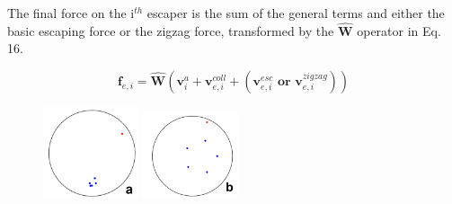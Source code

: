 \documentclass[%
11pt,
amsmath, amssymb,
aps,
pra
]{revtex4-2}
\newcommand{\threeImageSpacing}{0.25\textwidth}
\begin{document}
The final force on the i\(^{th}\) escaper is the sum of the general terms and either the basic escaping force or the zigzag
force, transformed by the \(\hat{\mathbf{W}}\) operator in Eq. 16.

\begin{equation}
    \mathbf{f}_{e, i} = \hat{\mathbf{W}}(\mathbf{v}_i^a + \mathbf{v}_{e, i}^{coll} + (\mathbf{v}_{e, i}^{esc} \textbf{ or } \mathbf{v}_{e, i}^{zigzag}))
\end{equation}



\begin{figure}[tb]
    \includegraphics[width=\threeImageSpacing]{images/chaseescape/0.png}
    \includegraphics[width=\threeImageSpacing]{images/chaseescape/1.png}

\end{figure}
\end{document}

